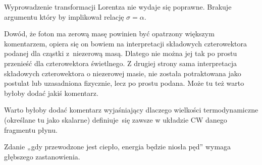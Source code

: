 \documentclass[a4paper,11pt]{article}
\begin{document}
\vspace{\spaceTwo}














\start {} Wyprowadzenie transformacji Lorentza nie wydaje się
poprawne. Brakuje argumentu który by implikował relację $\sigma = \alpha$.

\vspace{\spaceFour}



\start {} Dowód, że foton ma zerową masę powinien być
opatrzony większym komentarzem, opiera się on bowiem na
interpretacji składowych czterowektora podanej dla cząstki z~niezerową masą. Dlatego nie można jej tak po prostu przenieść dla
czterowektora świetlnego. Z drugiej strony sama interpretacja
składowych czterowektora o niezerowej masie, nie została
potraktowana jako postulat lub uzasadniona fizycznie, lecz po prostu
podana. Może tu też warto byłoby dodać jakiś komentarz.

\vspace{\spaceFour}



\start {} Warto byłoby dodać komentarz wyjaśniający dlaczego
wielkości termodynamiczne (określane tu jako skalarne) definiuje~się
zawsze w układzie CW danego fragmentu płynu.

\vspace{\spaceFour}



\start {} Zdanie „gdy przewodzone jest ciepło, energia
będzie niosła pęd” wymaga głębszego zastanowienia.





\end{document}
